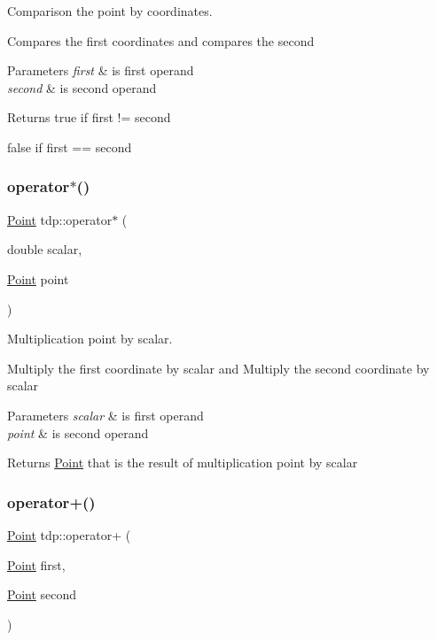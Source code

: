 Comparison the point by coordinates. 

Compares the first coordinates and compares the second 
\begin{DoxyParams}{Parameters}
{\em first} & is first operand \\
\hline
{\em second} & is second operand \\
\hline
\end{DoxyParams}
\begin{DoxyReturn}{Returns}
true if \textquotesingle{}first\textquotesingle{} != \textquotesingle{}second\textquotesingle{} 

false if \textquotesingle{}first\textquotesingle{} == \textquotesingle{}second\textquotesingle{} 
\end{DoxyReturn}
\mbox{\label{namespacetdp_a291c69f1bd3cf68f5c2b68fc3ab37f3a}} 
\subsubsection{\texorpdfstring{operator$\ast$()}{operator*()}}
{\footnotesize\ttfamily \mbox{\hyperlink{structtdp_1_1_point}{Point}} tdp\+::operator$\ast$ (\begin{DoxyParamCaption}\item[{double}]{scalar,  }\item[{\mbox{\hyperlink{structtdp_1_1_point}{Point}}}]{point }\end{DoxyParamCaption})}



Multiplication point by scalar. 

Multiply the first coordinate by scalar and Multiply the second coordinate by scalar 
\begin{DoxyParams}{Parameters}
{\em scalar} & is first operand \\
\hline
{\em point} & is second operand \\
\hline
\end{DoxyParams}
\begin{DoxyReturn}{Returns}
\mbox{\hyperlink{structtdp_1_1_point}{Point}} that is the result of multiplication point by scalar 
\end{DoxyReturn}
\mbox{\label{namespacetdp_a34cf3e1ef508e6a115b6c1d24a5dbb5d}} 
\subsubsection{\texorpdfstring{operator+()}{operator+()}}
{\footnotesize\ttfamily \mbox{\hyperlink{structtdp_1_1_point}{Point}} tdp\+::operator+ (\begin{DoxyParamCaption}\item[{\mbox{\hyperlink{structtdp_1_1_point}{Point}}}]{first,  }\item[{\mbox{\hyperlink{structtdp_1_1_point}{Point}}}]{second }\end{DoxyParamCaption})}



